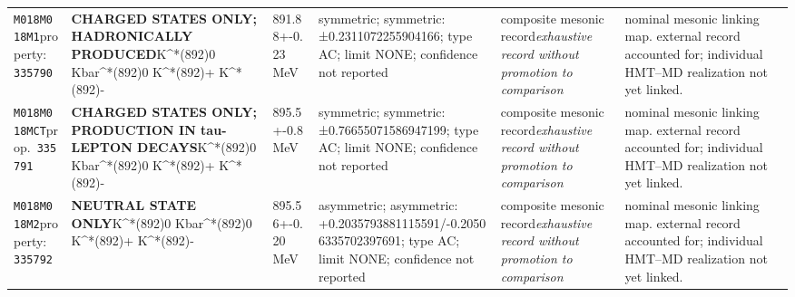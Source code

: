 \begin{landscape}
\begin{longtable}{L{1.85cm}L{4.45cm}L{2.35cm}L{4.05cm}L{3.35cm}L{7.15cm}}
\texttt{M018}\newline \texttt{M018M1}\newline property:\ \texttt{335790} & \textbf{CHARGED STATES ONLY; HADRONICALLY PRODUCED}\newline K\textasciicircum{}*(892)0 \textbar{}\allowbreak{} Kbar\textasciicircum{}*(892)0 \textbar{}\allowbreak{} K\textasciicircum{}*(892)+ \textbar{}\allowbreak{} K\textasciicircum{}*(892)- & 891.88+-0.23\,MeV & symmetric; symmetric: ±0.2311072255904166; type AC; limit NONE; confidence not reported & composite mesonic record\newline \emph{exhaustive record without promotion to comparison} & nominal mesonic linking map. external record accounted for; individual HMT--MD realization not yet linked. \\
\texttt{M018}\newline \texttt{M018MCT}\newline prop.\ \texttt{335791} & \textbf{CHARGED STATES ONLY; PRODUCTION IN tau-LEPTON DECAYS}\newline K\textasciicircum{}*(892)0 \textbar{}\allowbreak{} Kbar\textasciicircum{}*(892)0 \textbar{}\allowbreak{} K\textasciicircum{}*(892)+ \textbar{}\allowbreak{} K\textasciicircum{}*(892)- & 895.5+-0.8\,MeV & symmetric; symmetric: ±0.76655071586947199; type AC; limit NONE; confidence not reported & composite mesonic record\newline \emph{exhaustive record without promotion to comparison} & nominal mesonic linking map. external record accounted for; individual HMT--MD realization not yet linked. \\
\texttt{M018}\newline \texttt{M018M2}\newline property:\ \texttt{335792} & \textbf{NEUTRAL STATE ONLY}\newline K\textasciicircum{}*(892)0 \textbar{}\allowbreak{} Kbar\textasciicircum{}*(892)0 \textbar{}\allowbreak{} K\textasciicircum{}*(892)+ \textbar{}\allowbreak{} K\textasciicircum{}*(892)- & 895.56+-0.20\,MeV & asymmetric; asymmetric: +0.2035793881115591/-0.20506335702397691; type AC; limit NONE; confidence not reported & composite mesonic record\newline \emph{exhaustive record without promotion to comparison} & nominal mesonic linking map. external record accounted for; individual HMT--MD realization not yet linked. \\

\end{longtable}
\end{landscape}
